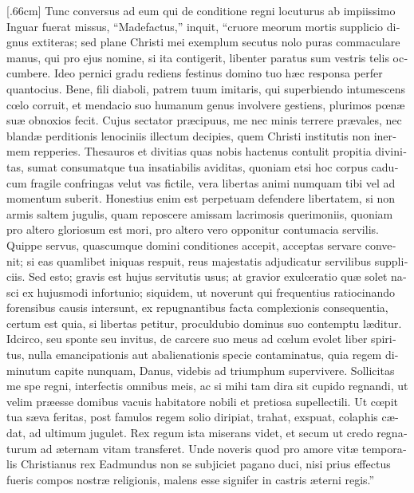 \documentclass[10pt]{book}
\begin{document}
\begin{paracol}{2}

\begin{otherlanguage}{latin}
[.66cm]
Tunc conversus ad eum qui de conditione regni locuturus ab impiissimo Inguar fuerat missus, ``Madefactus,'' inquit, ``cruore meorum mortis supplicio dignus extiteras; sed plane Christi mei exemplum secutus nolo puras commaculare manus, qui pro ejus nomine, si ita contigerit, libenter paratus sum vestris telis occumbere. Ideo pernici gradu rediens festinus domino tuo h\ae{}c responsa perfer quantocius. Bene, fili diaboli, patrem tuum imitaris, qui superbiendo intumescens c\oe{}lo corruit, et mendacio suo humanum genus involvere gestiens, plurimos p\oe{}n\ae{} su\ae{} obnoxios fecit. Cujus sectator pr\ae{}cipuus, me nec minis terrere pr\ae{}vales, nec bland\ae{} perditionis lenociniis illectum decipies, quem Christi institutis non inermem repperies. Thesauros et divitias quas nobis hactenus contulit propitia divinitas, sumat consumatque tua insatiabilis aviditas, quoniam etsi hoc corpus caducum fragile confringas velut vas fictile, vera libertas animi numquam tibi vel ad momentum suberit. Honestius enim est perpetuam defendere libertatem, si non armis saltem jugulis, quam reposcere amissam lacrimosis querimoniis, quoniam pro altero gloriosum est mori, pro altero vero opponitur contumacia servilis. Quippe servus, quascumque domini conditiones accepit, acceptas servare convenit; si eas quamlibet iniquas respuit, reus majestatis adjudicatur servilibus suppliciis. Sed esto; gravis est hujus servitutis usus; at gravior exulceratio qu\ae{} solet nasci ex hujusmodi infortunio; siquidem, ut noverunt qui frequentius ratiocinando forensibus causis intersunt, ex repugnantibus facta complexionis consequentia, certum est quia, si libertas petitur, proculdubio dominus suo contemptu l\ae{}ditur. Idcirco, seu sponte seu invitus, de carcere suo meus ad c\oe{}lum evolet liber spiritus, nulla emancipationis aut abalienationis specie contaminatus, quia regem diminutum capite nunquam, Danus, videbis ad triumphum supervivere. Sollicitas me spe regni, interfectis omnibus meis, ac si mihi tam dira sit cupido regnandi, ut velim pr\ae{}esse domibus vacuis habitatore nobili et pretiosa supellectili. Ut c\oe{}pit tua s\ae{}va feritas, post famulos regem solio diripiat, trahat, exspuat, colaphis c\ae{}dat, ad ultimum jugulet. Rex regum ista miserans videt, et secum ut credo regnaturum ad \ae{}ternam vitam transferet. Unde noveris quod pro amore vit\ae{} temporalis Christianus rex Eadmundus non se subjiciet pagano duci, nisi prius effectus fueris compos nostr\ae{} religionis, malens esse signifer in castris \ae{}terni regis.''
\end{otherlanguage}


\end{paracol}
\end{document}

